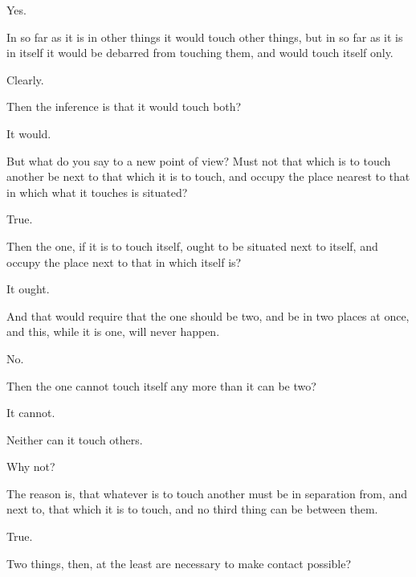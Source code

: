 \documentclass[11pt,letter]{article}
\begin{document}
\par  Yes.

\par  In so far as it is in other things it would touch other things, but in so far as it is in itself it would be debarred from touching them, and would touch itself only.

\par  Clearly.

\par  Then the inference is that it would touch both?

\par  It would.

\par  But what do you say to a new point of view? Must not that which is to touch another be next to that which it is to touch, and occupy the place nearest to that in which what it touches is situated?

\par  True.

\par  Then the one, if it is to touch itself, ought to be situated next to itself, and occupy the place next to that in which itself is?

\par  It ought.

\par  And that would require that the one should be two, and be in two places at once, and this, while it is one, will never happen.

\par  No.

\par  Then the one cannot touch itself any more than it can be two?

\par  It cannot.

\par  Neither can it touch others.

\par  Why not?

\par  The reason is, that whatever is to touch another must be in separation from, and next to, that which it is to touch, and no third thing can be between them.

\par  True.

\par  Two things, then, at the least are necessary to make contact possible?
\end{document}
